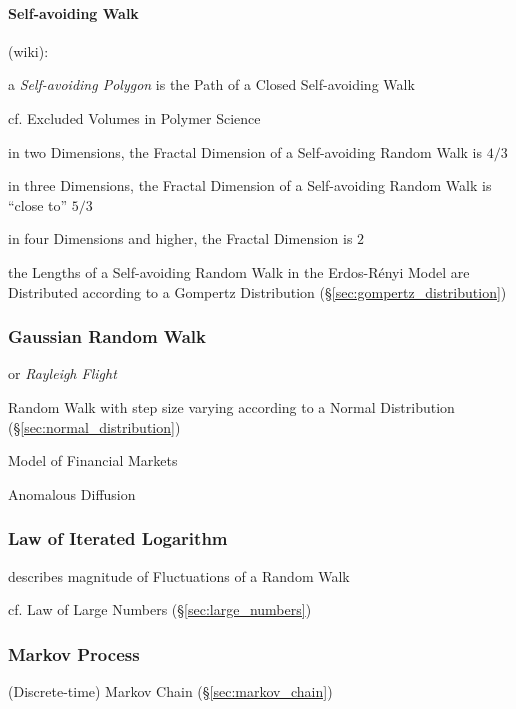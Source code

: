 \paragraph{Self-avoiding Walk}\label{sec:selfavoiding_walk}\hfill

(wiki):

a \emph{Self-avoiding Polygon} is the Path of a Closed Self-avoiding Walk

cf. Excluded Volumes in Polymer Science

in two Dimensions, the Fractal Dimension of a Self-avoiding Random Walk is $4/3$

in three Dimensions, the Fractal Dimension of a Self-avoiding Random Walk is
``close to'' $5/3$

in four Dimensions and higher, the Fractal Dimension is $2$

the Lengths of a Self-avoiding Random Walk in the Erdos-R\'enyi Model are
Distributed according to a Gompertz Distribution
(\S\ref{sec:gompertz_distribution})



\subsubsection{Gaussian Random Walk}\label{sec:gaussian_random_walk}

or \emph{Rayleigh Flight}

Random Walk with step size varying according to a Normal Distribution
(\S\ref{sec:normal_distribution})

Model of Financial Markets

Anomalous Diffusion



\subsubsection{Law of Iterated Logarithm}\label{sec:iterated_logarithm}

describes magnitude of Fluctuations of a Random Walk

cf. Law of Large Numbers (\S\ref{sec:large_numbers})



\subsubsection{Markov Process}\label{sec:markov_process}


\fist (Discrete-time) Markov Chain (\S\ref{sec:markov_chain})

